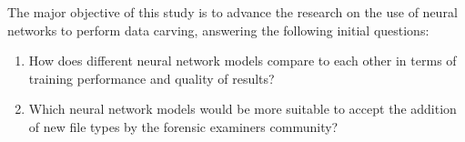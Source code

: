 
The major objective of this study is to advance the research on the use of neural networks to perform data carving, answering the following initial questions:

\begin{enumerate}[itemindent=\parindent,label=\textbf{Q\arabic*.}]

    \item How does different neural network models compare to each other in terms of training performance and quality of results?
    
    \item Which neural network models would be more suitable to accept the addition of new file types by the forensic examiners community? 

\end{enumerate}
